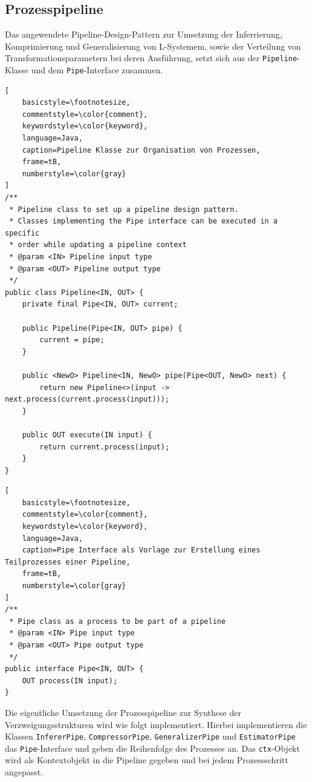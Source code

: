 \subsection*{Prozesspipeline}
Das angewendete Pipeline-Design-Pattern zur Umsetzung der Inferrierung, Komprimierung und Generalisierung von L-Systemem,
sowie der Verteilung von Transformationsparametern bei deren Ausführung, setzt sich aus der \texttt{Pipeline}-Klasse und
dem \texttt{Pipe}-Interface zusammen.

\newpage

\begin{lstlisting}[
    basicstyle=\footnotesize,
    commentstyle=\color{comment},
    keywordstyle=\color{keyword},
    language=Java,
    caption=Pipeline Klasse zur Organisation von Prozessen,
    frame=tB,
    numberstyle=\color{gray}
]
/**
 * Pipeline class to set up a pipeline design pattern.
 * Classes implementing the Pipe interface can be executed in a specific
 * order while updating a pipeline context
 * @param <IN> Pipeline input type
 * @param <OUT> Pipeline output type
 */
public class Pipeline<IN, OUT> {
    private final Pipe<IN, OUT> current;

    public Pipeline(Pipe<IN, OUT> pipe) {
        current = pipe;
    }

    public <NewO> Pipeline<IN, NewO> pipe(Pipe<OUT, NewO> next) {
        return new Pipeline<>(input -> next.process(current.process(input)));
    }

    public OUT execute(IN input) {
        return current.process(input);
    }
}
\end{lstlisting}

\begin{lstlisting}[
    basicstyle=\footnotesize,
    commentstyle=\color{comment},
    keywordstyle=\color{keyword},
    language=Java,
    caption=Pipe Interface als Vorlage zur Erstellung eines Teilprozesses einer Pipeline,
    frame=tB,
    numberstyle=\color{gray}
]
/**
 * Pipe class as a process to be part of a pipeline
 * @param <IN> Pipe input type
 * @param <OUT> Pipe output type
 */
public interface Pipe<IN, OUT> {
    OUT process(IN input);
}
\end{lstlisting}

Die eigentliche Umsetzung der Prozesspipeline zur Synthese der Verzweigungsstrukturen wird wie folgt implementiert.
Hierbei implementieren die Klassen \texttt{InfererPipe}, \texttt{CompressorPipe}, \texttt{GeneralizerPipe} und
\texttt{EstimatorPipe} das \texttt{Pipe}-Interface und geben die Reihenfolge des Prozesses an.
Das \texttt{ctx}-Objekt wird als Kontextobjekt in die Pipeline gegeben und bei jedem Prozessschritt angepasst.

